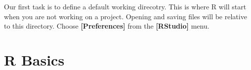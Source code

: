 \documentclass[draft]{article}\usepackage[]{graphicx}\usepackage[]{color}
\begin{document}
 Our first task is to define a default working direcotry. This is where R will start when you are not working on a project. Opening and saving files will be relative to this directory. Choose \textbf{[Preferences]} from the \textbf{[RStudio]} menu.

  

  
  \section{R Basics}
  
\end{document}

